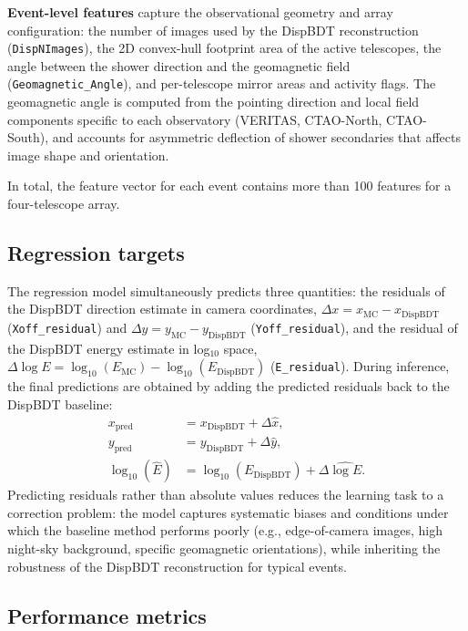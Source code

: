 \documentclass[12pt]{article}
\begin{document}
\textbf{Event-level features} capture the observational geometry and array
configuration: the number of images used by the DispBDT reconstruction
(\texttt{DispNImages}), the 2D convex-hull footprint area of the active telescopes,
the angle between the shower direction and the geomagnetic field
(\texttt{Geomagnetic\_Angle}), and per-telescope mirror areas and activity flags.
The geomagnetic angle is computed from the pointing direction and local field
components specific to each observatory (VERITAS, CTAO-North, CTAO-South),
and accounts for asymmetric deflection of shower secondaries that affects
image shape and orientation.

In total, the feature vector for each event contains more than 100 features
for a four-telescope array.

\subsection{Regression targets}
\label{sec:targets}

The regression model simultaneously predicts three quantities:
the residuals of the DispBDT direction estimate in camera coordinates,
$\Delta x = x_\mathrm{MC} - x_\mathrm{DispBDT}$ (\texttt{Xoff\_residual}) and
$\Delta y = y_\mathrm{MC} - y_\mathrm{DispBDT}$ (\texttt{Yoff\_residual}),
and the residual of the DispBDT energy estimate in log$_{10}$ space,
$\Delta\log E = \log_{10}(E_\mathrm{MC}) - \log_{10}(E_\mathrm{DispBDT})$ (\texttt{E\_residual}).
During inference, the final predictions are obtained by adding the predicted
residuals back to the DispBDT baseline:
\begin{align}
  x_\mathrm{pred} &= x_\mathrm{DispBDT} + \Delta\hat{x}, \\
  y_\mathrm{pred} &= y_\mathrm{DispBDT} + \Delta\hat{y}, \\
  \log_{10}(\hat{E}) &= \log_{10}(E_\mathrm{DispBDT}) + \Delta\hat{\log E}.
\end{align}
Predicting residuals rather than absolute values reduces the learning task
to a correction problem: the model captures systematic biases and conditions
under which the baseline method performs poorly
(e.g., edge-of-camera images, high night-sky background, specific geomagnetic orientations),
while inheriting the robustness of the DispBDT reconstruction for typical events.

\subsection{Performance metrics}
\label{sec:metrics}
\end{document}
